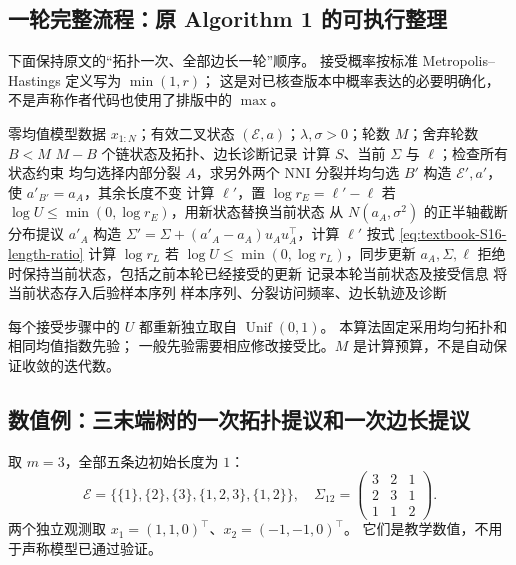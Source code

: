 \subsection{一轮完整流程：原 Algorithm 1 的可执行整理}

下面保持原文的“拓扑一次、全部边长一轮”顺序。
接受概率按标准 Metropolis--Hastings 定义写为 $\min(1,r)$；
这是对已核查版本中概率表达的必要明确化，不是声称作者代码也使用了排版中的 $\max$。

\begin{algorithm}[htbp]
\caption{S16：树状态上的拓扑与边长交替 MH（原流程的等价整理）}
\label{alg:textbook-S16}
\begin{algorithmic}[1]
\Require 零均值模型数据 $x_{1:N}$；有效二叉状态 $(\mathcal E,a)$；$\lambda,\sigma>0$；轮数 $M$；舍弃轮数 $B<M$
\Ensure $M-B$ 个链状态及拓扑、边长诊断记录
\State 计算 $S$、当前 $\Sigma$ 与 $\ell$；检查所有状态约束
    \State 均匀选择内部分裂 $A$，求另外两个 NNI 分裂并均匀选 $B'$
    \State 构造 $\mathcal E',a'$，使 $a'_{B'}=a_A$，其余长度不变
    \State 计算 $\ell'$，置 $\log r_E=\ell'-\ell$
    \State 若 $\log U\le\min(0,\log r_E)$，用新状态替换当前状态
  \EndIf
    \State 从 $N(a_A,\sigma^2)$ 的正半轴截断分布提议 $a'_A$
    \State 构造 $\Sigma'=\Sigma+(a'_A-a_A)u_Au_A^\top$，计算 $\ell'$
    \State 按式 \eqref{eq:textbook-S16-length-ratio} 计算 $\log r_L$
    \State 若 $\log U\le\min(0,\log r_L)$，同步更新 $a_A,\Sigma,\ell$
    \State 拒绝时保持当前状态，包括之前本轮已经接受的更新
  \EndFor
  \State 记录本轮当前状态及接受信息
    \State 将当前状态存入后验样本序列
  \EndIf
\EndFor
\State \Return 样本序列、分裂访问频率、边长轨迹及诊断
\end{algorithmic}
\end{algorithm}

每个接受步骤中的 $U$ 都重新独立取自 $\operatorname{Unif}(0,1)$。
本算法固定采用均匀拓扑和相同均值指数先验；
一般先验需要相应修改接受比。$M$ 是计算预算，不是自动保证收敛的迭代数。

\subsection{数值例：三末端树的一次拓扑提议和一次边长提议}

取 $m=3$，全部五条边初始长度为 $1$：
\[
 \mathcal E=\{\{1\},\{2\},\{3\},\{1,2,3\},\{1,2\}\},
 \quad
 \Sigma_{12}=
 \begin{pmatrix}3&2&1\\2&3&1\\1&1&2\end{pmatrix}.
\]
两个独立观测取
$x_1=(1,1,0)^\top$、$x_2=(-1,-1,0)^\top$。
它们是教学数值，不用于声称模型已通过验证。

